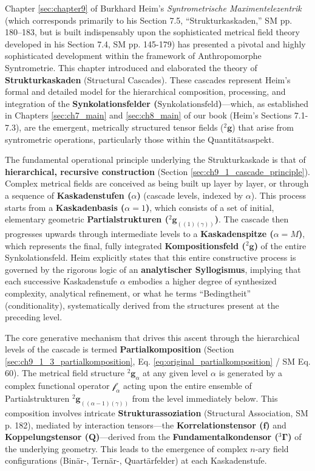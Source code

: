 \documentclass[
    12pt,              %
    a4paper,           %
    headings=normal,   %
    twoside=true,      %
    BCOR=8mm,          %
]{scrbook}
\newcommand{\q}[1]{\enquote{#1}}
\newcommand{\kompositionsfeld}{{}^2\mathbf{g}}
\newcommand{\partialstruktur}[1]{{}^2\mathbf{g}_{(#1)}}
\newcommand{\fundamentalkondensor}{{}^3\bm{\Gamma}}
\newcommand{\korrelationstensor}{\mathbf{f}}
\newcommand{\koppelungstensor}{\mathbf{Q}}
\newcommand{\kaskadenstufe}{\alpha}
\newcommand{\synkolatorfeld}{\text{Synkolationsfeld}}
\begin{document}
Chapter \ref{sec:chapter9} of Burkhard Heim's \textit{Syntrometrische Maximentelezentrik} (which corresponds primarily to his Section 7.5, \q{Strukturkaskaden,} SM pp. 180–183, but is built indispensably upon the sophisticated metrical field theory developed in his Section 7.4, SM pp. 145-179) has presented a pivotal and highly sophisticated development within the framework of Anthropomorphe Syntrometrie. This chapter introduced and elaborated the theory of \textbf{Strukturkaskaden} (Structural Cascades). These cascades represent Heim's formal and detailed model for the hierarchical composition, processing, and integration of the \textbf{Synkolationsfelder (\(\synkolatorfeld\))}—which, as established in Chapters \ref{sec:ch7_main} and \ref{sec:ch8_main} of our book (Heim's Sections 7.1-7.3), are the emergent, metrically structured tensor fields (\(\kompositionsfeld\)) that arise from syntrometric operations, particularly those within the Quantitätsaspekt.

The fundamental operational principle underlying the Strukturkaskade is that of \textbf{hierarchical, recursive construction} (Section \ref{sec:ch9_1_cascade_principle}). Complex metrical fields are conceived as being built up layer by layer, or through a sequence of \textbf{Kaskadenstufen (\(\kaskadenstufe\))} (cascade levels, indexed by \(\kaskadenstufe\)). This process starts from a \textbf{Kaskadenbasis (\(\kaskadenstufe=1\))}, which consists of a set of initial, elementary geometric \textbf{Partialstrukturen (\(\partialstruktur{(1)(\gamma)}\))}. The cascade then progresses upwards through intermediate levels to a \textbf{Kaskadenspitze (\(\kaskadenstufe=M\))}, which represents the final, fully integrated \textbf{Kompositionsfeld (\(\kompositionsfeld\))} of the entire Synkolationsfeld. Heim explicitly states that this entire constructive process is governed by the rigorous logic of an \textbf{analytischer Syllogismus}, implying that each successive Kaskadenstufe \(\kaskadenstufe\) embodies a higher degree of synthesized complexity, analytical refinement, or what he terms \q{Bedingtheit} (conditionality), systematically derived from the structures present at the preceding level.

The core generative mechanism that drives this ascent through the hierarchical levels of the cascade is termed \textbf{Partialkomposition} (Section \ref{sec:ch9_1_3_partialkomposition}, Eq. \eqref{eq:original_partialkomposition} / SM Eq. 60). The metrical field structure \(\kompositionsfeld_\alpha\) at any given level \(\kaskadenstufe\) is generated by a complex functional operator \(\mathcal{f}_\alpha\) acting upon the entire ensemble of Partialstrukturen \(\partialstruktur{(\alpha-1)(\gamma)}\) from the level immediately below. This composition involves intricate \textbf{Strukturassoziation} (Structural Association, SM p. 182), mediated by interaction tensors—the \textbf{Korrelationstensor (\(\korrelationstensor\))} and \textbf{Koppelungstensor (\(\koppelungstensor\))}—derived from the \textbf{Fundamentalkondensor (\(\fundamentalkondensor\))} of the underlying geometry. This leads to the emergence of complex \(n\)-ary field configurations (Binär-, Ternär-, Quartärfelder) at each Kaskadenstufe.
\end{document}
